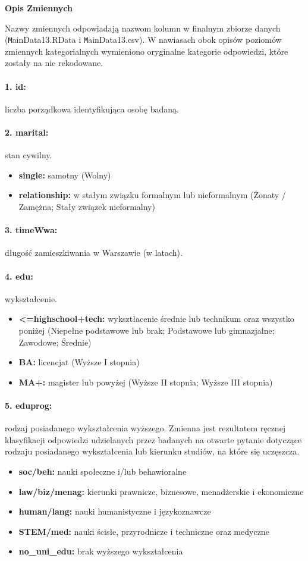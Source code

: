 \documentclass[10pt, a4paper]{article}
\begin{document}
\begin{center} {\LARGE\bf Opis Zmiennych} \end{center}

\noindent Nazwy zmiennych odpowiadają nazwom kolumn w finalnym zbiorze danych ({\texttt MainData13.RData} i {\texttt MainData13.csv}). W nawiasach obok opisów poziomów zmiennych kategorialnych wymieniono oryginalne kategorie odpowiedzi, które zostały na nie rekodowane.

\paragraph{1. id:} liczba porządkowa identyfikująca osobę badaną. \\
\paragraph{2. marital:} stan cywilny.
\begin{itemize}
	\item {\bf single:} samotny (Wolny)
	\item {\bf relationship:} w stałym związku formalnym lub nieformalnym (Żonaty / Zamężna; Stały związek nieformalny)
\end{itemize}
\paragraph{3. timeWwa:} długość zamieszkiwania w Warszawie (w latach).
\paragraph{4. edu:} wykształcenie.
\begin{itemize}
	\item {\bf <=highschool+tech:} wyksztłacenie średnie lub technikum oraz wszystko poniżej (Niepełne podstawowe lub brak; Podstawowe lub gimnazjalne; Zawodowe; Średnie)
	\item {\bf BA:} licencjat (Wyższe I stopnia)
	\item {\bf MA+:} magister lub powyżej (Wyższe II stopnia; Wyższe III stopnia)
\end{itemize}
\paragraph{5. eduprog:} rodzaj posiadanego wykształcenia wyższego. Zmienna jest rezultatem ręcznej klasyfikacji odpowiedzi udzielanych przez badanych na otwarte pytanie dotyczące rodzaju posiadanego wykształcenia lub kierunku studiów, na które się uczęszcza.
\begin{itemize}
	\item {\bf soc/beh:} nauki społeczne i/lub behawioralne
	\item {\bf law/biz/menag:} kierunki prawnicze, biznesowe, menadżerskie i ekonomiczne
	\item {\bf human/lang:} nauki humanistyczne i językoznawcze
	\item {\bf STEM/med:} nauki ścisłe, przyrodnicze i techniczne oraz medyczne
	\item {\bf no\_uni\_edu:} brak wyższego wykształcenia
\end{itemize}
\end{document}
